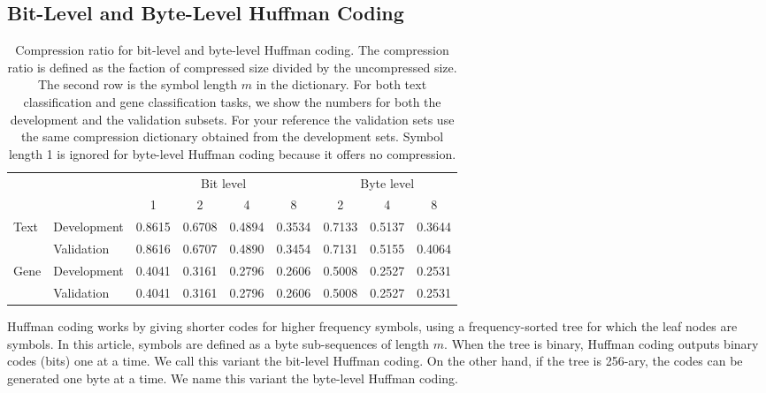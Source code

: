 \documentclass[sigconf,review, anonymous]{acmart}
\begin{document}
\subsection{Bit-Level and Byte-Level Huffman Coding}

\begin{table}[t]
  \caption{Compression ratio for bit-level and byte-level Huffman coding. The compression ratio is defined as the faction of compressed size divided by the uncompressed size. The second row is the symbol length $m$ in the dictionary. For both text classification and gene classification tasks, we show the numbers for both the development and the validation subsets. For your reference the validation sets use the same compression dictionary obtained from the development sets. Symbol length 1 is ignored for byte-level Huffman coding because it offers no compression.}
  \label{tab:compression}
  \begin{center}
    \begin{tabular}{ll|rrrr|rrr}
      \hline
      & & \multicolumn{4}{c}{Bit level} & \multicolumn{3}{|c}{Byte level} \\
      & & \multicolumn{1}{c}{1} & \multicolumn{1}{c}{2} & \multicolumn{1}{c}{4} & \multicolumn{1}{c}{8} & \multicolumn{1}{|c}{2} & \multicolumn{1}{c}{4} & \multicolumn{1}{c}{8} \\ \hline
      \multirow{2}{*}{Text} & Development & 0.8615 & 0.6708 & 0.4894 & 0.3534 & 0.7133 & 0.5137 & 0.3644 \\
      & Validation & 0.8616 & 0.6707 & 0.4890 & 0.3454 & 0.7131 & 0.5155 & 0.4064 \\ \hline
      \multirow{2}{*}{Gene}  & Development & 0.4041 & 0.3161 & 0.2796 & 0.2606 & 0.5008 & 0.2527 & 0.2531 \\
      & Validation & 0.4041 & 0.3161 & 0.2796 & 0.2606 & 0.5008 & 0.2527 & 0.2531 \\
    \hline
    \end{tabular}
  \end{center}
\end{table}

Huffman coding \cite{H52} works by giving shorter codes for higher frequency symbols, using a frequency-sorted tree for which the leaf nodes are symbols. In this article, symbols are defined as a byte sub-sequences of length \(m\). When the tree is binary, Huffman coding outputs binary codes (bits) one at a time. We call this variant the bit-level Huffman coding. On the other hand, if the tree is 256-ary, the codes can be generated one byte at a time. We name this variant the byte-level Huffman coding.
\end{document}
